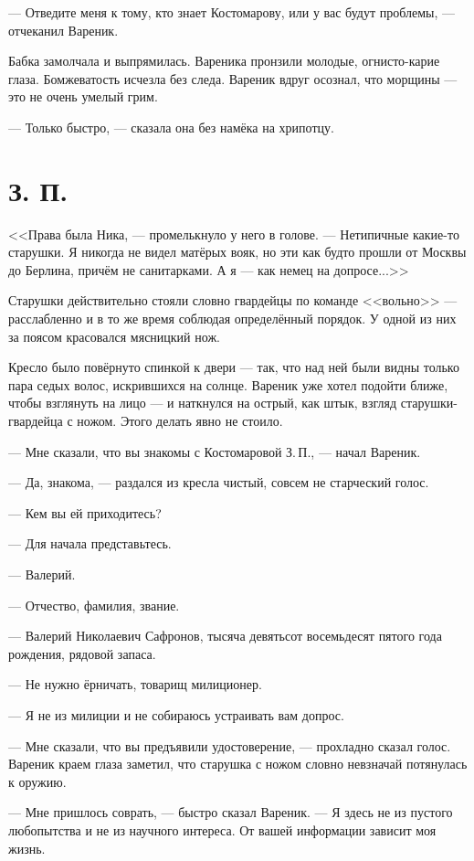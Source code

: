 \documentclass[a4paper,10pt,fleqn]{book}\usepackage{polyglossia}\setdefaultlanguage{english}\setotherlanguage{russian}\defaultfontfeatures{Ligatures=TeX,Mapping=tex-text} \usepackage{xcolor}\definecolor{lightgray}{HTML}{bbbbbb}\color{lightgray}\newcommand{\ml}[3]{\textcolor{black}{#3}}
\begin{document}
--- Отведите меня к тому, кто знает Костомарову, или у вас будут проблемы, --- отчеканил Вареник.

Бабка замолчала и выпрямилась.
Вареника пронзили молодые, огнисто-карие глаза.
Бомжеватость исчезла без следа.
Вареник вдруг осознал, что морщины --- это не очень умелый грим.

--- Только быстро, --- сказала она без намёка на хрипотцу.

\section{З. П.}

<<Права была Ника, --- промелькнуло у него в голове.
--- Нетипичные какие-то старушки.
Я никогда не видел матёрых вояк, но эти как будто прошли от Москвы до Берлина, причём не санитарками.
А я --- как немец на допросе...>>

Старушки действительно стояли словно гвардейцы по команде <<вольно>> --- расслабленно и в то же время соблюдая определённый порядок.
У одной из них за поясом красовался мясницкий нож.

Кресло было повёрнуто спинкой к двери --- так, что над ней были видны только пара седых волос, искрившихся на солнце.
Вареник уже хотел подойти ближе, чтобы взглянуть на лицо --- и наткнулся на острый, как штык, взгляд старушки-гвардейца с ножом.
Этого делать явно не стоило.

--- Мне сказали, что вы знакомы с Костомаровой З.\,П., --- начал Вареник.

--- Да, знакома, --- раздался из кресла чистый, совсем не старческий голос.

--- Кем вы ей приходитесь?

--- Для начала представьтесь.

--- Валерий.

--- Отчество, фамилия, звание.

--- Валерий Николаевич Сафронов, тысяча девятьсот восемьдесят пятого года рождения, рядовой запаса.

--- Не нужно ёрничать, товарищ милиционер.

--- Я не из милиции и не собираюсь устраивать вам допрос.

--- Мне сказали, что вы предъявили удостоверение, --- прохладно сказал голос.
Вареник краем глаза заметил, что старушка с ножом словно невзначай потянулась к оружию.

--- Мне пришлось соврать, --- быстро сказал Вареник.
--- Я здесь не из пустого любопытства и не из научного интереса.
От вашей информации зависит моя жизнь.
\end{document}
